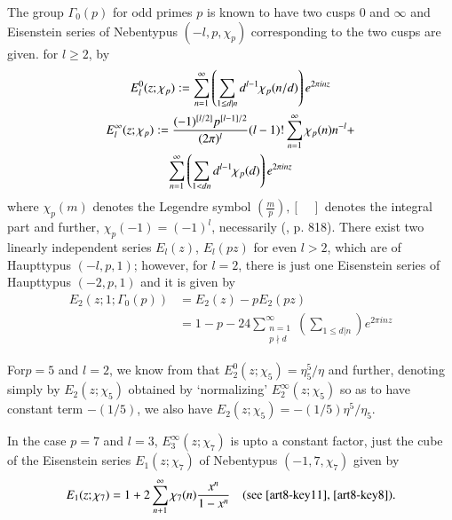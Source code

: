 The group $\Gamma_{0}(p)$ for odd primes $p$ is known to have two cusps $0$ and $\infty$ and Eisenstein series of Nebentypus $(-l, p, \chi_{p})$ corresponding to the two cusps are given. for $l\geq 2$, by
\begin{gather}
E^{0}_{l}(z;\chi_{p}):= \sum\limits^{\infty}_{n=1}\left(\sum\limits_{1\leq d|n}d^{l-1}\chi_{p}(n/d)\right)e^{2\pi inz}\label{art8-eq6}\\
E^{\infty}_{l}(z;\chi_{p}):=\frac{(-1)^{[l/2]}p^{[l-1]/2}}{(2\pi)^{l}}(l-1)!\sum\limits^{\infty}_{n=1}\chi_{p}(n)n^{-l}+\notag\\
\sum\limits^{\infty}_{n=1}\left(\sum\limits_{1<dn}d^{l-1}\chi_{p}(d)\right)e^{2\pi inz}\notag
\end{gather}
where $\chi_{p}(m)$ denotes the Legendre symbol $(\frac{m}{p}),[\quad]$ denotes the integral part and further, $\chi_{p}(-1)=(-1)^{l}$, necessarily (\cite{art8-key5}, p. 818). There exist two linearly independent series $E_{l}(z)$, $E_{l}(pz)$ for even $l>2$, which are of Haupttypus $(-l,p,1)$; however, for $l=2$, there is just one Eisenstein series of Haupttypus $(-2, p, 1)$ and it is given by
\begin{align*}
E_{2}(z;1;\Gamma_{0}(p)) &= E_{2}(z)-pE_{2}(pz)\\
&= 1-p-24\sum\limits^{\infty}_{\substack{n=1\\ p\nmid d}}\left(\sum\limits_{1\leq d|n}\right)e^{2\pi inz}
\end{align*}

For\pageoriginale $p=5$ and $l=2$, we know from \cite{art8-key8} that $E^{0}_{2}(z;\chi_{5})=\eta^{5}_{5}/\eta$ and further, denoting simply by $E_{2}(z;\chi_{5})$ obtained by `normalizing' $E^{\infty}_{2}(z;\chi_{5})$ so as to have constant term $-(1/5)$, we also have $E_{2}(z;\chi_{5})=-(1/5)\eta^{5}/\eta_{5}$.

In the case $p=7$ and $l=3$, $E^{\infty}_{3}(z;\chi_{7})$ is upto a constant factor, just the cube of the Eisenstein series $E_{1}(z;\chi_{7})$ of Nebentypus $(-1,7,\chi_{7})$ given by
$$
E_{1}(z;\chi_{7})=1+2\sum\limits^{\infty}_{n+1}\chi_{7}(n)\dfrac{x^{n}}{1-x^{n}}\quad \text{(see \cite{art8-key11}, \cite{art8-key8})}.
$$

